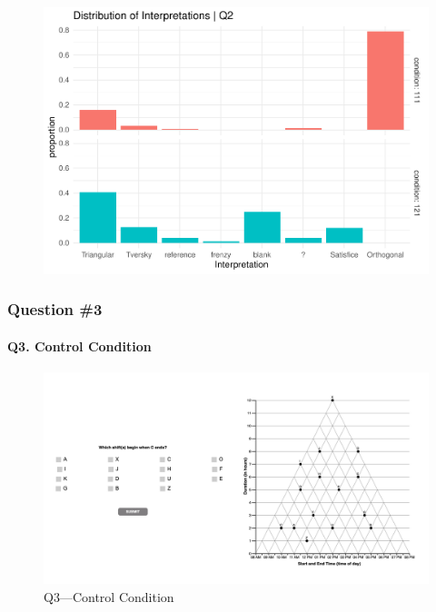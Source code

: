 \documentclass[
  letterpaper,
  DIV=11,
  numbers=noendperiod]{scrreprt}
\let\oldparagraph\paragraph
\renewcommand{\paragraph}[1]{\oldparagraph{#1}\mbox{}}
\begin{document}
\begin{figure}[H]

{\centering \includegraphics{analysis/SGC3A/2_sgc3A_scoring_files/figure-pdf/Q2-distribution-2.pdf}

}

\end{figure}

\hypertarget{question-3}{%
\subsubsection{Question \#3}\label{question-3}}

\hypertarget{q3.-control-condition}{%
\paragraph{Q3. Control Condition}\label{q3.-control-condition}}

\begin{figure}

{\centering \includegraphics{analysis/SGC3A/static/questions/Q3_111.png}

}

\caption{\label{fig-Q3-111}Q3---Control Condition}

\end{figure}
\end{document}
